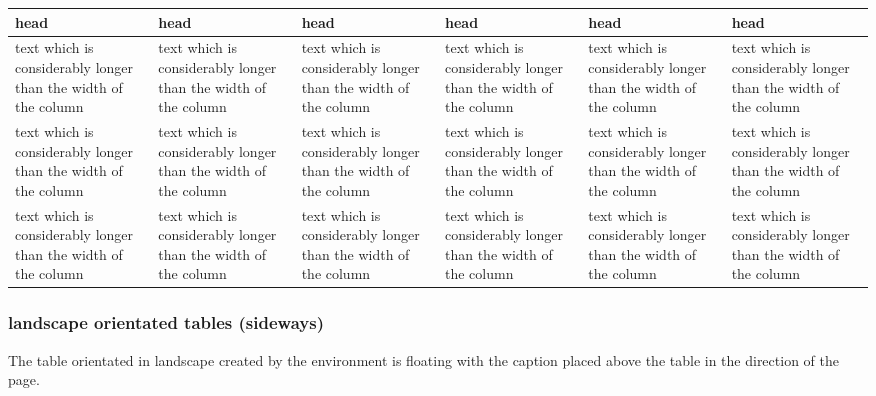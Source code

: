 \begin{filecontents*}{\democodefile}
\begin{table}[H]
  \centering\small\renewcommand{\arraystretch}{1.4}\sffamily
\begin{sideways}
\begin{tabularx}{0.90\textheight}{*{6}{X}}
\hline
\rowcolor{tableheadcolor}
head & head & head & head & head & head \\
\hline
text which is considerably longer than the width of the column & 
text which is considerably longer than the width of the column & 
text which is considerably longer than the width of the column &
text which is considerably longer than the width of the column & 
text which is considerably longer than the width of the column & 
text which is considerably longer than the width of the column \\
text which is considerably longer than the width of the column & 
text which is considerably longer than the width of the column & 
text which is considerably longer than the width of the column &
text which is considerably longer than the width of the column & 
text which is considerably longer than the width of the column & 
text which is considerably longer than the width of the column \\
text which is considerably longer than the width of the column & 
text which is considerably longer than the width of the column & 
text which is considerably longer than the width of the column &
text which is considerably longer than the width of the column & 
text which is considerably longer than the width of the column & 
text which is considerably longer than the width of the column \\
\hline
\end{tabularx}	
\end{sideways}
\end{table}
\end{filecontents*}

\subsubsection{landscape orientated tables (sideways)}
\label{sec:tableLargeSideways}

The table orientated in landscape created by the environment  is floating with the caption placed above the table in the direction of the page.

